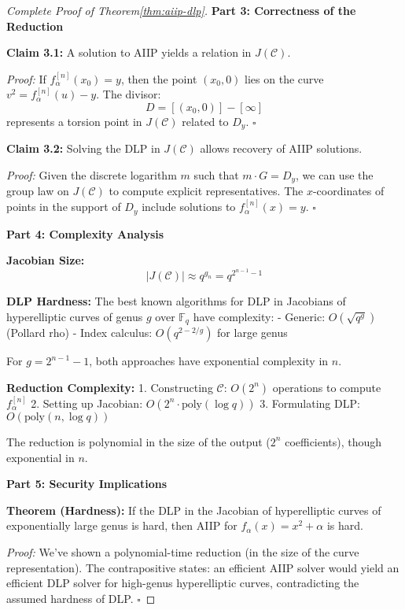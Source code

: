 \begin{proof}[Complete Proof of Theorem\ref{thm:aiip-dlp}]
\textbf{Part 3: Correctness of the Reduction}

    \textbf{Claim 3.1:} A solution to AIIP yields a relation in $J(\mathcal{C})$.

    \textit{Proof:} If $f_\alpha^{[n]}(x_0) = y$, then the point $(x_0, 0)$ lies on the 
    curve $v^2 = f_\alpha^{[n]}(u) - y$. The divisor:
    $$D = [(x_0, 0)] - [\infty]$$
    represents a torsion point in $J(\mathcal{C})$ related to $D_y$. $\square$

    \textbf{Claim 3.2:} Solving the DLP in $J(\mathcal{C})$ allows recovery of AIIP solutions.

    \textit{Proof:} Given the discrete logarithm $m$ such that $m \cdot G = D_y$, we can 
    use the group law on $J(\mathcal{C})$ to compute explicit representatives. The 
    $x$-coordinates of points in the support of $D_y$ include solutions to 
    $f_\alpha^{[n]}(x) = y$. $\square$

\textbf{Part 4: Complexity Analysis}

    \textbf{Jacobian Size:}
    $$|J(\mathcal{C})| \approx q^{g_n} = q^{2^{n-1} - 1}$$

    \textbf{DLP Hardness:}
    The best known algorithms for DLP in Jacobians of hyperelliptic curves of genus $g$ over 
    $\mathbb{F}_q$ have complexity:
    - Generic: $O(\sqrt{q^g})$ (Pollard rho)
    - Index calculus: $O(q^{2 - 2/g})$ for large genus

    For $g = 2^{n-1} - 1$, both approaches have exponential complexity in $n$.

    \textbf{Reduction Complexity:}
    1. Constructing $\mathcal{C}$: $O(2^n)$ operations to compute $f_\alpha^{[n]}$
    2. Setting up Jacobian: $O(2^n \cdot \text{poly}(\log q))$
    3. Formulating DLP: $O(\text{poly}(n, \log q))$

    The reduction is polynomial in the size of the output ($2^n$ coefficients), though 
    exponential in $n$.

\textbf{Part 5: Security Implications}

    \textbf{Theorem (Hardness):} If the DLP in the Jacobian of hyperelliptic curves of 
    exponentially large genus is hard, then AIIP for $f_\alpha(x) = x^2 + \alpha$ is hard.

    \textit{Proof:} We've shown a polynomial-time reduction (in the size of the curve 
    representation). The contrapositive states: an efficient AIIP solver would yield an 
    efficient DLP solver for high-genus hyperelliptic curves, contradicting the assumed 
    hardness of DLP. $\square$


\end{proof}
